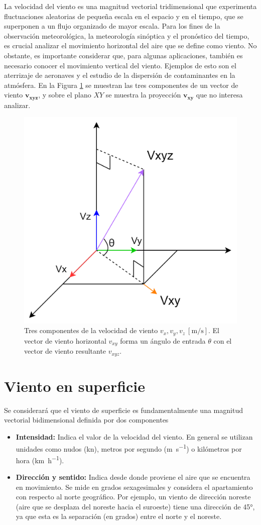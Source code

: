  La velocidad del viento es una magnitud vectorial tridimensional que experimenta fluctuaciones aleatorias de pequeña escala en el espacio y en el tiempo, que se superponen a un flujo organizado de mayor escala. Para los fines de la observación meteorológica, la meteorología sinóptica y el pronóstico del tiempo, es crucial analizar el movimiento horizontal del aire que se define como viento. No obstante, es importante considerar que, para algunas aplicaciones, también es necesario conocer el movimiento vertical del viento. Ejemplos de esto son el aterrizaje de aeronaves y el estudio de la dispersión de contaminantes en la atmósfera. En la Figura \ref{fig:vectorVelocidad} se muestran las tres componentes de un vector de viento $\mathbf{v_{xyz}}$, y sobre el plano $XY$ se muestra la proyección $\mathbf{v_{xy}}$ que no interesa analizar.

\begin{figure}[H]
    \centering
    \includegraphics[width=0.5\linewidth]{Figuras/introduccion/vectorVelocidad.png}
    \caption{Tres componentes de la velocidad de viento $v_{x}, v_{y}, v_{z}\  [\unit{\meter\per\second}]$. El vector de viento horizontal $v_{xy}$ forma un ángulo de entrada $\theta$ con el vector de viento resultante $v_{xyz}$.} 
    \label{fig:vectorVelocidad}
\end{figure}
\section{Viento en superficie}\label{sec:vientoEnSuperficie}
Se considerará que el viento de superficie es fundamentalmente una magnitud vectorial bidimensional definida por dos componentes
\begin{itemize}
    \item \textbf{Intensidad:} Indica el valor de la velocidad del viento. En general se utilizan unidades como nudos (\unit{\knot}), metros por segundo (\unit{\meter\per\second}) o kilómetros por hora (\unit{\kilo\meter\per\hour}).
    \item \textbf{Dirección y sentido:} Indica desde donde proviene el aire que se encuentra en movimiento. Se mide en grados sexagesimales y considera el apartamiento con respecto al norte geográfico. Por ejemplo, un viento de dirección noreste (aire que se desplaza del noreste hacia el suroeste) tiene una dirección de 45°, ya que esta es la separación (en grados) entre el norte y el noreste.
\end{itemize}

